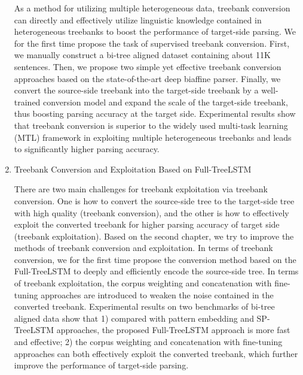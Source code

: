 \begin{eabstract}
\begin{enumerate}
              As a method for utilizing multiple heterogeneous data, treebank conversion can directly and effectively utilize linguistic knowledge contained in heterogeneous treebanks to boost the performance of target-side parsing.
              We for the first time propose the task of supervised treebank conversion. First, we manually construct a bi-tree aligned dataset containing about 11K sentences. Then, we propose two simple yet effective treebank conversion approaches based on the state-of-the-art deep biaffine parser. Finally, we convert the source-side treebank into the target-side treebank by a well-trained conversion model and expand the scale of the target-side treebank, thus boosting parsing accuracy at the target side. Experimental results show that treebank conversion is superior to the widely used multi-task learning (MTL) framework in exploiting multiple heterogeneous treebanks and leads to significantly higher parsing accuracy.

        \item Treebank Conversion and Exploitation Based on Full-TreeLSTM

              There are two main challenges for treebank exploitation via treebank conversion. One is how to convert  the source-side tree to the target-side tree with high quality (treebank conversion), and the other is how to eﬀectively exploit the converted treebank for higher parsing accuracy of target side (treebank exploitation).
              Based on the second chapter, we try to improve the methods of treebank conversion and  exploitation.
              In terms of treebank conversion, we for the first time propose the conversion method based on the Full-TreeLSTM to deeply and efficiently encode the source-side tree.
              In terms of treebank exploitation, the corpus weighting and concatenation with fine-tuning approaches are introduced to weaken the noise contained in the converted treebank. Experimental results on two benchmarks of bi-tree aligned data show that 1) compared with pattern embedding and SP-TreeLSTM approaches, the proposed Full-TreeLSTM approach is more fast and effective; 2) the corpus weighting and concatenation with fine-tuning approaches can both effectively exploit the converted treebank, which further improve the performance of target-side parsing.



\end{enumerate}
\end{eabstract}
